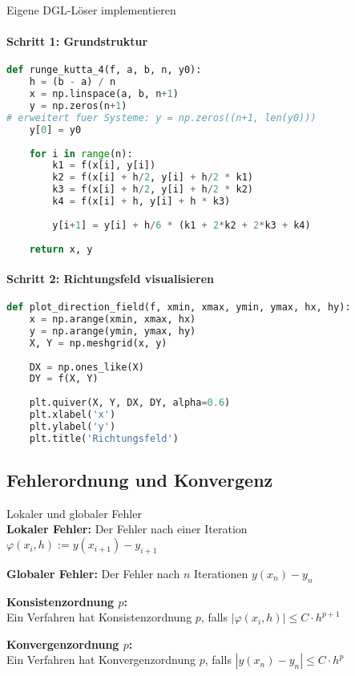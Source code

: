 \begin{KR}{Eigene DGL-Löser implementieren}
\paragraph{Schritt 1: Grundstruktur}
\begin{lstlisting}[language=Python, style=basesmol]
def runge_kutta_4(f, a, b, n, y0):
    h = (b - a) / n
    x = np.linspace(a, b, n+1)
    y = np.zeros(n+1) 
# erweitert fuer Systeme: y = np.zeros((n+1, len(y0)))
    y[0] = y0
    
    for i in range(n):
        k1 = f(x[i], y[i])
        k2 = f(x[i] + h/2, y[i] + h/2 * k1)
        k3 = f(x[i] + h/2, y[i] + h/2 * k2)
        k4 = f(x[i] + h, y[i] + h * k3)
        
        y[i+1] = y[i] + h/6 * (k1 + 2*k2 + 2*k3 + k4)
    
    return x, y
\end{lstlisting}

\paragraph{Schritt 2: Richtungsfeld visualisieren}
\begin{lstlisting}[language=Python, style=basesmol]
def plot_direction_field(f, xmin, xmax, ymin, ymax, hx, hy):
    x = np.arange(xmin, xmax, hx)
    y = np.arange(ymin, ymax, hy)
    X, Y = np.meshgrid(x, y)
    
    DX = np.ones_like(X)
    DY = f(X, Y)
    
    plt.quiver(X, Y, DX, DY, alpha=0.6)
    plt.xlabel('x')
    plt.ylabel('y')
    plt.title('Richtungsfeld')
\end{lstlisting}
\end{KR}

\subsection{Fehlerordnung und Konvergenz}

\begin{definition}{Lokaler und globaler Fehler}\\
\textbf{Lokaler Fehler:} Der Fehler nach einer Iteration\\
$\varphi(x_i, h) := y(x_{i+1}) - y_{i+1}$

\textbf{Globaler Fehler:} Der Fehler nach $n$ Iterationen
$y(x_n) - y_n$

\textbf{Konsistenzordnung $p$:} \\ Ein Verfahren hat Konsistenzordnung $p$, falls
$|\varphi(x_i, h)| \leq C \cdot h^{p+1}$

\textbf{Konvergenzordnung $p$:} \\ Ein Verfahren hat Konvergenzordnung $p$, falls
$|y(x_n) - y_n| \leq C \cdot h^p$
\end{definition}

